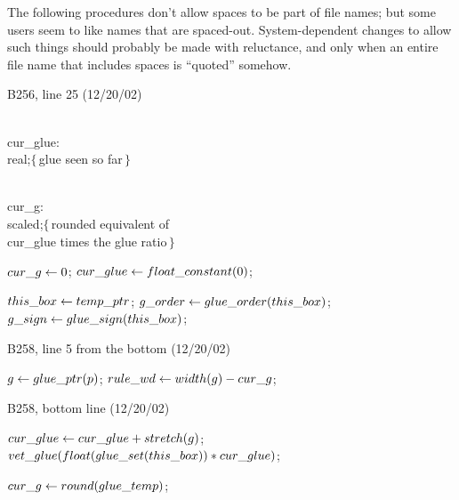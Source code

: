 {\tenpoint\noindent\quad
The following procedures don't allow spaces to be part of
file names; but some users seem to like names that are spaced-out.
System-dependent changes to allow such things should probably
be made with reluctance, and only when an entire file name that
includes spaces is ``quoted'' somehow.

\bugonpage B256, line 25 (12/20/02)

\ninepoint\noindent
\qquad\\{cur\_glue}: \\{real};\quad$\{\,$glue seen so far$\,\}$\par\noindent
\qquad\\{cur\_g}: \\{scaled};\quad$\{\,$rounded
  equivalent of \\{cur\_glue} times the glue ratio$\,\}$\par\noindent
{} $\\{cur\_g}\gets0$;
  $\\{cur\_glue}\gets\\{float\_constant}(0)$;\par\noindent
\quad$\\{this\_box}\gets\\{temp\_ptr}$;
 $\\{g\_order}\gets\\{glue\_order}(\\{this\_box})$;
 $\\{g\_sign}\gets\\{glue\_sign}(\\{this\_box})$;

\bugonpage B258, line 5 from the bottom (12/20/02)

\ninepoint\noindent
{} $g\gets\\{glue\_ptr}(p)$;
  $\\{rule\_wd}\gets\\{width}(g)-\\{cur\_g}$;

\bugonpage B258, bottom line (12/20/02)

\ninepoint\noindent
\qquad{} $\\{cur\_glue}\gets\\{cur\_glue}+\\{stretch}(g)$;
 $\\{vet\_glue}(\\{float}(\\{glue\_set}(\\{this\_box}))*\\{cur\_glue})$;\par
\noindent\qquad\qquad$\\{cur\_g}\gets\\{round}(\\{glue\_temp})$;

}

